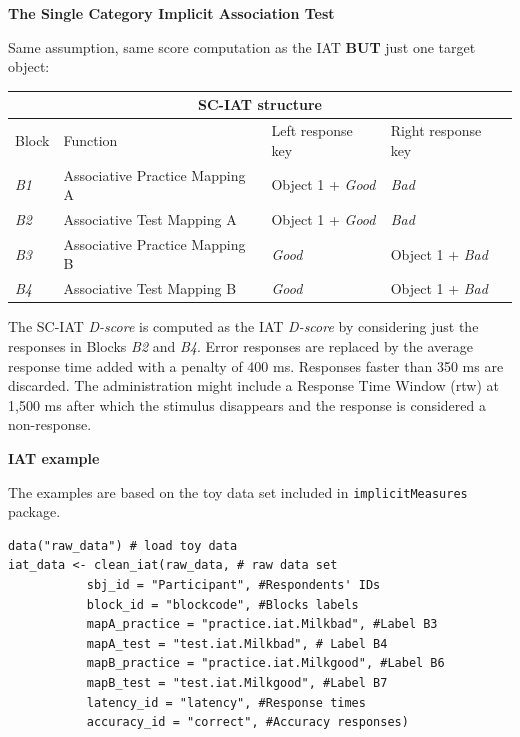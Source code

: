 \documentclass[a0,landscape]{a0poster}
\begin{document}
\begin{multicols*}{3}
\vspace{3mm}
\begin{center}
	\Large \textbf{\textcolor{title}{The Single Category Implicit Association Test}}
\end{center}

Same assumption, same score computation as the IAT \textbf{BUT} just one target object: 
\begin{center}
	\begin{tabular}{llll}
		\multicolumn{4}{c}{SC-IAT structure \label{tab:sciat}}\\
		\toprule
		Block & Function & Left response key & Right response key  \\
		\midrule
		\emph{B1} & Associative Practice Mapping A & Object 1 + \emph{Good} & \emph{Bad} \\
		\textcolor{comp}{\emph{B2} } & \textcolor{comp}{Associative Test Mapping A} & \textcolor{comp}{Object 1 + \emph{Good}} & \textcolor{comp}{\emph{Bad}} \\
		\emph{B3} & Associative Practice Mapping B & \emph{Good} & Object 1 + \emph{Bad} \\
		\textcolor{inc}{\emph{B4}} & \textcolor{inc}{Associative Test Mapping B} & \textcolor{inc}{ \emph{Good}} & \textcolor{inc}{Object 1 + \emph{Bad} }\\
		\bottomrule
	\end{tabular}
\end{center}

\vspace{3mm}
The SC-IAT \emph{D-score} is computed as the IAT \emph{D-score} by considering just the responses in Blocks \emph{B2} and \emph{B4}. Error responses are replaced by the average response time added with a penalty of 400 ms. Responses faster than 350 ms are discarded. The administration might include a Response Time Window (rtw) at 1,500 ms after which the stimulus disappears and the response is considered a non-response. 



\vfill\null
\columnbreak

\begin{center}
	\huge \textbf{\textcolor{title}{IAT example}}
\end{center}

The examples are based on the toy data set included in \texttt{implicitMeasures} package. 
\begin{lstlisting}
data("raw_data") # load toy data
iat_data <- clean_iat(raw_data, # raw data set 
           sbj_id = "Participant", #Respondents' IDs
           block_id = "blockcode", #Blocks labels
           mapA_practice = "practice.iat.Milkbad", #Label B3
           mapA_test = "test.iat.Milkbad", # Label B4
           mapB_practice = "practice.iat.Milkgood", #Label B6
           mapB_test = "test.iat.Milkgood", #Label B7
           latency_id = "latency", #Response times
           accuracy_id = "correct", #Accuracy responses)
\end{lstlisting}


\end{multicols*}
\end{document}
